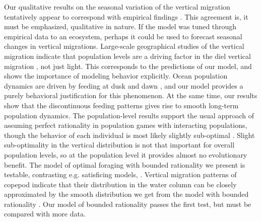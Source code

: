 


Our qualitative results on the seasonal variation of the vertical migration tentatively appear to correspond with empirical findings \citep{wang2014seasonal, beaugrand2001geographical, colebrook1979continuous}. This agreement is, it must be emphasized, qualitative in nature. If the model was tuned through empirical data to an ecosystem, perhaps it could be used to forecast seasonal changes in vertical migrations. Large-scale geographical studies of the vertical migration indicate that population levels are a driving factor in the diel vertical migration \citep{klevjer2016large}, not just light. This corresponds to the predictions of our model, and shows the importance of modeling behavior explicitly.
Ocean population dynamics are driven by feeding at dusk and dawn \citep{benoit2014critical}, and our model provides a purely behavioral justification for this phenomenon. At the same time, our results show that the discontinuous feeding patterns gives rise to smooth long-term population dynamics. The population-level results support the usual approach of assuming perfect rationality in population games with interacting populations, though the behavior of each individual is most likely slightly sub-optimal \citep{hurly1999context}. Slight sub-optimality in the vertical distribution is not that important for overall population levels, so at the population level it provides almost no evolutionary benefit.
The model of optimal foraging with bounded rationality we present is testable, contrasting e.g. satisficing models, \citep{nonacs1993satisficing}. Vertical migration patterns of copepod indicate that their distribution in the water column can be closely approximated by the smooth distribution we get from the model with bounded rationality \citep{hay1991zooplankton, visser2001observations}. Our model of bounded rationality passes the first test, but must be compared with more data.

